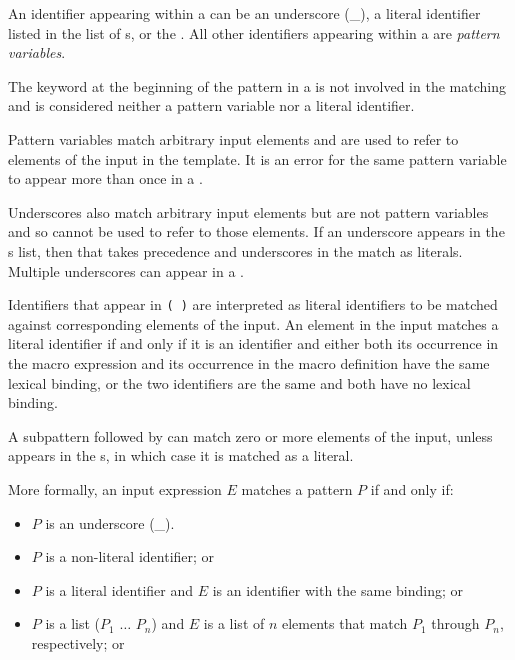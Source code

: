 \begin{entry}
An identifier appearing within a  can be an underscore
({\cf \_}), a literal identifier listed in the list of s,
or the .
All other identifiers appearing within a  are
{\em pattern variables}.

The keyword at the beginning of the pattern in a
 is not involved in the matching and
is considered neither a pattern variable nor a literal identifier.

Pattern variables match arbitrary input elements and
are used to refer to elements of the input in the template.
It is an error for the same pattern variable to appear more than once in a
.

Underscores also match arbitrary input elements but are not pattern variables
and so cannot be used to refer to those elements.  If an underscore appears
in the s list, then that takes precedence and
underscores in the  match as literals.
Multiple underscores can appear in a .

Identifiers that appear in \texttt{( \dotsfoo)} are
interpreted as literal
identifiers to be matched against corresponding elements of the input.
An element in the input matches a literal identifier if and only if it is an
identifier and either both its occurrence in the macro expression and its
occurrence in the macro definition have the same lexical binding, or
the two identifiers are the same and both have no lexical binding.

A subpattern followed by  can match zero or more elements of
the input, unless  appears in the s, in which
case it is matched as a literal.

More formally, an input expression $E$ matches a pattern $P$ if and only if:

\begin{itemize}
\item $P$ is an underscore ({\cf \_}).

\item $P$ is a non-literal identifier; or

\item $P$ is a literal identifier and $E$ is an identifier with the same
      binding; or

\item $P$ is a list {\cf ($P_1$ $\dots$ $P_n$)} and $E$ is a
      list of $n$
      elements that match $P_1$ through $P_n$, respectively; or


\end{itemize}
\end{entry}
